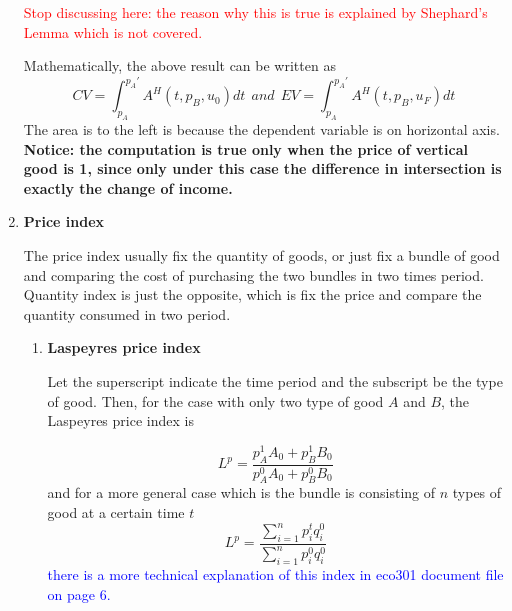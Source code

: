 \documentclass[10pt]{article}
\newenvironment{changemargin}[2]{%
  \begin{list}{}{%
    \setlength{\topsep}{0pt}%
    \setlength{\leftmargin}{#1}%
    \setlength{\rightmargin}{#2}%
    \setlength{\listparindent}{\parindent}%
    \setlength{\itemindent}{\parindent}%
    \setlength{\parsep}{\parskip}%
  }%
  \item[]}{\end{list}}
\begin{document}
\begin{changemargin}{-0.125in}{0in}
\begin{enumerate}
                  \textcolor{red}{Stop discussing here: the reason why this is true is explained by Shephard’s Lemma which is not covered.}
                  
                  
                  \medskip
                  
                  Mathematically, the above result can be written as 
                  \[
                  CV = \int^{p_A'}_{p_A} A^H(t,p_B,u_0)dt\:\: and \:\:EV = \int^{p_A'}_{p_A} A^H(t,p_B,u_F)dt
                  \]
                  The area is to the left is because the dependent variable is on horizontal axis. \textbf{Notice: the computation is true only when the price of vertical good is 1, since only under this case the difference in intersection is exactly the change of income.}


                  \bigskip
                  
                  \item 
                  \textbf{Price index}
                  
                  \smallskip
                  
                  The price index usually fix the quantity of goods, or just fix a bundle of good and comparing the cost of purchasing the two bundles in two times period. Quantity index is just the opposite, which is fix the price and compare the quantity consumed in two period.
                  
                  \begin{enumerate}
                  
                  \item \textbf{Laspeyres price index}
                  
                  \smallskip
                  
                  Let the superscript indicate the time period and the subscript be the type of good. Then, for the case with only two type of good $A$ and $B$, the Laspeyres price index is 
                  
                  \[
                  L^p=\frac{p_A^1A_0+p_B^1B_0}{p_A^0 A_0+p_B^0B_0}
                  \] 
                  and for a more general case which is the bundle is consisting of $n$ types of good at a certain time $t$
                  \[
                  L^p = \frac{\sum^n_{i=1}p^t_iq_i^0}{\sum^n_{i=1}p^0_iq^0_i}
                  \]
                  \textcolor{blue}{there is a more technical explanation of this index in eco301 document file on page 6.}
                  

\end{enumerate}
\end{enumerate}
\end{changemargin}
\end{document}
